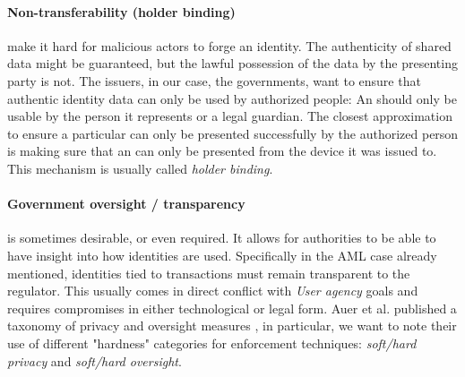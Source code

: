 \paragraph{Non-transferability (holder binding)} make it hard for malicious actors to forge an identity.
The authenticity of shared data might be guaranteed, but the lawful possession of the data by the presenting party is not. The issuers, in our case, the governments, want to ensure that authentic identity data can only be used by authorized people: An \eid should only be usable by the person it represents or a legal guardian. The closest approximation to ensure a particular \eid can only be presented successfully by the authorized person is making sure that an \eid can only be presented from the device it was issued to. This mechanism is usually called \emph{holder binding}.

\paragraph{Government oversight / transparency} is sometimes desirable, or even required.
It allows for authorities to be able to have insight into how identities are used. Specifically in the AML case already mentioned, identities tied to transactions must remain transparent to the regulator. This usually comes in direct conflict with \emph{User agency} goals and requires compromises in either technological or legal form. Auer et al. published a taxonomy of privacy and oversight measures \cite{ABCD25}, in particular, we want to note their use of different "hardness" categories for enforcement techniques: \emph{soft/hard privacy} and \emph{soft/hard oversight}.

